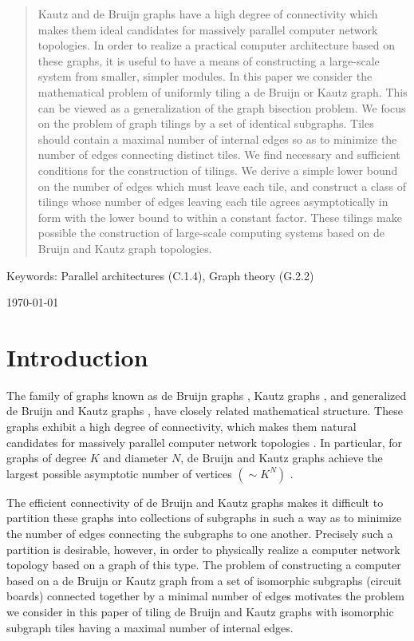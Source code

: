 \documentclass[12pt]{article}
\begin{document}
\begin{titlepage}
\begin{abstract}
Kautz and de Bruijn graphs have
a high degree of connectivity which makes them ideal candidates for
massively parallel computer network topologies.  In order to realize a
practical computer architecture based on these graphs, it is useful to
have a means of constructing a large-scale system from smaller,
simpler modules.  In this paper we consider the mathematical problem
of uniformly tiling a de Bruijn or Kautz graph.  This can be viewed as
a generalization of the graph bisection problem.  We focus on the
problem of graph tilings by a set of identical subgraphs.  Tiles
should contain a maximal number of internal edges so as to minimize
the number of edges connecting distinct tiles.  We find necessary and
sufficient conditions for the construction of tilings.  We derive a
simple lower bound on the number of edges which must leave each tile,
and construct a class of tilings whose number of edges leaving each
tile agrees asymptotically in form with the lower bound to within a
constant factor.  These tilings make possible the construction of
large-scale computing systems based on de Bruijn and Kautz graph
topologies.
\end{abstract}
\vspace*{0.2in}
Keywords: Parallel architectures (C.1.4), Graph theory (G.2.2)

\vspace{1cm}
\begin{flushleft}
\today
\end{flushleft}
\end{titlepage}
\newpage


\section{Introduction}

The family of graphs known as de Bruijn graphs
\cite{db},
Kautz graphs \cite{Kautz}, and generalized de Bruijn and Kautz graphs
\cite{ii1, ii2, rpk, dch}, have closely
related mathematical structure.  These graphs exhibit a high degree of
connectivity, which makes them natural candidates for massively
parallel computer network topologies \cite{bp}.  In particular, for
graphs of degree $K$ and diameter $N$, de Bruijn and Kautz graphs
achieve the largest possible asymptotic number of vertices $(\sim
K^N)$ \cite{pz}.

The efficient connectivity of de Bruijn and Kautz graphs makes it
difficult to partition these graphs into collections of subgraphs in
such a way as to minimize the number of edges connecting the subgraphs
to one another.  Precisely such a partition is desirable, however, in
order to physically realize a computer network topology based on a
graph of this type.  The problem of constructing a computer based on a
de Bruijn or Kautz graph from a set of isomorphic subgraphs (circuit
boards) connected together by a minimal number of edges motivates the
problem we consider in this paper of tiling de Bruijn and Kautz graphs
with isomorphic subgraph tiles having a maximal number of internal
edges.
\end{document}

